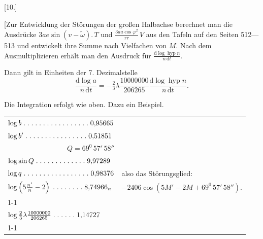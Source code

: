 \clearpage
\begin{landscape}
\begingroup
\fontsize{10}{13}\selectfont
{}
\renewcommand{\headrulewidth}{0pt}
\begin{center}[10.]\end{center}
\par\noindent\hspace*{\parindent}[Zur Entwicklung der Störungen der großen Halbachse berechnet man die Ausdrücke \(3ae\sin(v-\tilde\omega)\mathord{.}\,T\) und \(\frac{3aa\cos\varphi^2}{rr}\,V\) aus den Tafeln auf den Seiten 512—513 und entwickelt ihre Summe nach Vielfachen von \(M\). Nach dem Ausmultiplizieren erhält man den Ausdruck für \(\frac{\mathrm{d}\log\operatorname{hyp}n}{n\,\mathrm{d}t}\).
\par\noindent{}\hspace*{\parindent}Dann gilt in Einheiten der 7. Dezimalstelle
\[
\frac{\mathrm{d}\log a}{n\,\mathrm{d}t}=-\tfrac{2}{3}\lambda\frac{10000000}{206265}\frac{\mathrm{d}\log\operatorname{hyp}n}{n\,\mathrm{d}t}.
\]
\par\noindent\hspace*{\parindent}Die Integration erfolgt wie oben. Dazu ein Beispiel.
\begingroup
\newcommand{\VTenPoint}{\mathord{.}\mkern5mu}
\newcommand{\VTenFive}{\VTenPoint\VTenPoint\VTenPoint\VTenPoint\VTenPoint}
\begin{center}
\begin{tabular}{@{}l@{\quad}l@{}}
\(\log b\;\VTenFive\VTenFive\VTenFive\VTenPoint\VTenPoint0{,}95665\)&\\
\(\log b'\;\VTenFive\VTenFive\VTenFive\VTenPoint0{,}51851\)&\\
\multicolumn{1}{r}{\(Q=69^0\,57'\,58''\)}&\\
\(\log\sin Q\;\VTenFive\VTenFive\VTenPoint\VTenPoint\VTenPoint9{,}97289\)&\\
\(\log q\;\VTenFive\VTenFive\VTenFive\VTenPoint\VTenPoint0{,}98376\)&also das Störungsglied:\\
\(\log\left(5\frac{n'}{n}-2\right)\;\VTenFive\VTenPoint\VTenPoint\VTenPoint8{,}74966_n\)&\(-2406\cos(5M'-2M+69^0\,57'\,58'').\)\\
\cline{1-1}
\multicolumn{1}{r}{\(2{,}23410\)}&\\[3pt]
\(\log\tfrac{2}{3}\lambda\frac{10000000}{206265}\;\VTenFive\VTenPoint1{,}14727\)&\\
\cline{1-1}
\multicolumn{1}{r}{\(3{,}38137_n\)}&

\end{tabular}
\end{center}
\end{landscape}
